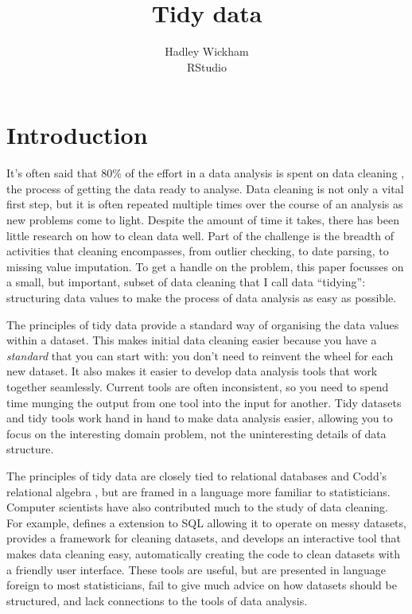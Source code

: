 \documentclass[article]{jss}
\author{Hadley Wickham\\RStudio}
\title{Tidy data}
\begin{document}
\maketitle

\section{Introduction}

It's often said that 80\% of the effort in a data analysis is spent on data cleaning \citep{dasu:2003}, the process of getting the data ready to analyse. Data cleaning is not only a vital first step, but it is often repeated multiple times over the course of an analysis as new problems come to light. Despite the amount of time it takes, there has been little research on how to clean data well. Part of the challenge is the breadth of activities that cleaning encompasses, from outlier checking, to date parsing, to missing value imputation. To get a handle on the problem, this paper focusses on a small, but important, subset of data cleaning that I call data ``tidying'': structuring data values to make the process of data analysis as easy as possible.

The principles of tidy data provide a standard way of organising the data values within a dataset. This makes initial data cleaning easier because you have a \emph{standard} that you can start with: you don't need to reinvent the wheel for each new dataset. It also makes it easier to develop data analysis tools that work together seamlessly. Current tools are often inconsistent, so you need to spend time munging the output from one tool into the input for another. Tidy datasets and tidy tools work hand in hand to make data analysis easier, allowing you to focus on the interesting domain problem, not the uninteresting details of data structure.  

The principles of tidy data are closely tied to relational databases and Codd's relational algebra \citep{codd:1990}, but are framed in a language more familiar to statisticians. Computer scientists have also contributed much to the study of data cleaning. For example, \citet{lakshmanan:1996} defines a extension to SQL allowing it to operate on messy datasets, \citet{raman:2001} provides a framework for cleaning datasets, and \citet{kandel:2011} develops an interactive tool that makes data cleaning easy, automatically creating the code to clean datasets with a friendly user interface. These tools are useful, but are presented in language foreign to most statisticians, fail to give much advice on how datasets should be structured, and lack connections to the tools of data analysis.
\end{document}
